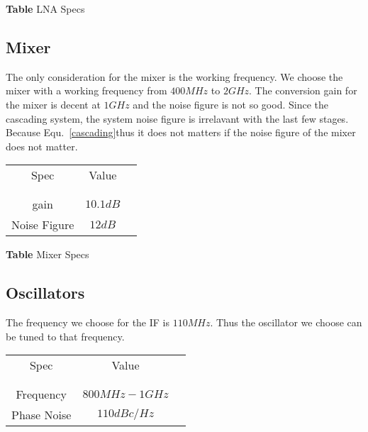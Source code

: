 \documentclass[]{article}
\begin{document}
        \begin{center}
            \textbf{Table} LNA Specs
        \end{center}

    \subsection{Mixer}
        The only consideration for the mixer is the working frequency. We choose
        the mixer with a working frequency from $400MHz$ to $2GHz$. The
        conversion gain for the mixer is decent at $1GHz$ and the noise figure
        is not so good. Since the cascading system, the system noise figure is
        irrelavant with the last few stages. Because Equ.~\ref{cascading}thus it
        does not matters if the noise figure of the mixer does not matter.

        \begin{center}
            \begin{tabular}{c c c}
                Spec & Value \\ \\ \hline \\
                gain & $10.1dB$ \\
                Noise Figure & $12dB$ \\
            \end{tabular}
        \end{center}

        \begin{center}
            \textbf{Table} Mixer Specs
        \end{center}

    \subsection{Oscillators}
        The frequency we choose for the IF is $110MHz$. Thus the oscillator we
        choose can be tuned to that frequency.

        \begin{center}
            \begin{tabular}{c c c}
                Spec & Value \\ \\ \hline \\
                Frequency & $800MHz-1GHz$ \\
                Phase Noise & $110dBc/Hz$ \\
            \end{tabular}
        \end{center}
\end{document}
